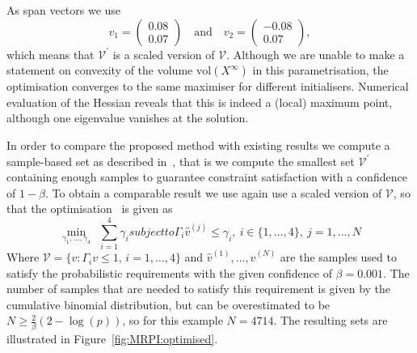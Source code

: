 \documentclass{ifacconf}
\providecommand{\vol}{\text{vol}}
\providecommand{\V}{\mathcal V}
\providecommand{\bfa}[1]{\mathbf{#1}}
\begin{document}
%
As span vectors we use 
\[
v_1 = \begin{pmatrix} 0.08 \\ 0.07\end{pmatrix} \quad \text{and}\quad 
v_2 = \begin{pmatrix}-0.08 \\ 0.07\end{pmatrix},
\] 
which means that $\V^\prime$ is a scaled version of $\V$.
%
Although we are unable to make a statement on convexity of the volume $\vol(X^\infty)$ in this parametrisation, the optimisation converges to the same maximiser for different initialisers. Numerical evaluation of the Hessian reveals that this is indeed a (local) maximum point, although one eigenvalue vanishes at the solution.
%

In order to compare the proposed method with existing results we compute a sample-based set as described in~\cite{Zhang2015}, that is we compute the smallest set $\V^\prime$ containing enough samples to guarantee constraint satisfaction with a confidence of $1-\beta$.
%
To obtain a comparable result we use again use a scaled version of $\V$, so that the optimisation~\citep[eq.~(10)]{Zhang2015} is given as
%
\begin{subequations}\label{eq:comparison:set}
\begin{equation}\min_{\gamma_1,\dots,\gamma_4} \  \ \sum_{i=1}^4\gamma_i
\end{equation}
subject to 
\begin{equation}
\Gamma_i \hat{v}^{(j)}\leq \gamma_i ,\ i\in\{1,\ldots,4\}, \ j = 1,\ldots,N
\end{equation}
\end{subequations}
%
Where $\V = \{v : \Gamma_i v \leq 1, \, i =1, \ldots ,4\}$ and
$\hat{v}^{(1)},\ldots,\hat{v}^{(N)}$
are the samples used to satisfy the probabilistic requirements with the given confidence of $\beta=0.001$. The number of samples that are needed to satisfy this requirement is given by the cumulative binomial distribution, but can be overestimated to be $N \geq \frac{2}{\beta}(2-\log(p))$, so for this example $N = 4714$.
%
The resulting sets are illustrated in Figure~\ref{fig:MRPI:optimised}.
%
\end{document}
